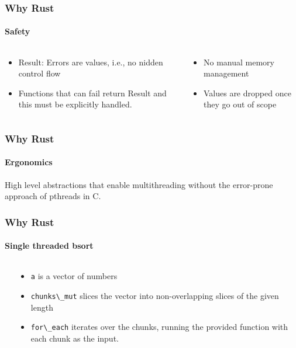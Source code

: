 \documentclass[aspectratio=169]{beamer}
\begin{document}
\begin{frame}
	\frametitle{Why Rust}
	\framesubtitle{Safety}

	\begin{columns}
		\begin{column}{0.4\textwidth}
			\begin{itemize}
                \item Result: Errors are values, i.e., no nidden control flow
                \item Functions that can fail return Result and this must be explicitly handled.
			\end{itemize}
		\end{column}
        \begin{column}{0.4\textwidth}
            \begin{itemize}
                \item No manual memory management
                \item Values are dropped once they go out of scope
            \end{itemize}
        \end{column}
	\end{columns}
\end{frame}

\begin{frame}
	\frametitle{Why Rust}
	\framesubtitle{Ergonomics}

    High level abstractions that enable multithreading without the error-prone approach of pthreads in C.
\end{frame}

\begin{frame}
	\frametitle{Why Rust}
	\framesubtitle{Single threaded bsort}
	\begin{columns}
		\begin{column}{ 0.5\textwidth }
			
		\end{column}
		\begin{column}{ 0.4\textwidth }
			\begin{itemize}
				\item \Verb|a| is a vector of numbers
				\item \Verb|chunks\_mut| slices the vector into non-overlapping slices of the given length
				\item \Verb|for\_each| iterates over the chunks, running the provided function with each chunk as the input.
			\end{itemize}
		\end{column}
	\end{columns}
\end{frame}
\end{document}

